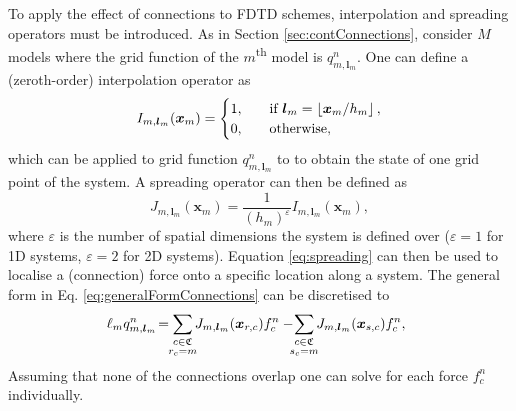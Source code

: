 \documentclass{article}
\begin{document}
To apply the effect of connections to FDTD schemes, interpolation and spreading operators must be introduced. As in Section \ref{sec:contConnections}, consider $M$ models where the grid function of the $m$\textsuperscript{th} model is $q_{m, \boldsymbol{l}_m}^n$. One can define a (zeroth-order) interpolation operator as
\begin{equation}
    I_{m, \boldsymbol{l}_m}(\boldsymbol{x}_m) = \begin{cases}
    1,&\quad \text{if}\ \boldsymbol{l}_m= \floor[\boldsymbol{x}_m/h_m],\\
    0, &\quad\text{otherwise},
    \end{cases}
\end{equation}
which can be applied to grid function $q_{m, \boldsymbol{l}_m}^n$ to to obtain the state of one grid point of the system. A spreading operator can then be defined as
\begin{equation}\label{eq:spreading}
    J_{m, \boldsymbol{l}_m}(\boldsymbol{x}_m) = \frac{1}{(h_m)^\varepsilon}I_{m, \boldsymbol{l}_m}(\boldsymbol{x}_m),
\end{equation}
where $\varepsilon$ is the number of spatial dimensions the system is defined over ($\varepsilon = 1$ for 1D systems, $\varepsilon = 2$ for 2D systems). Equation \eqref{eq:spreading} can then be used to localise a (connection) force onto a specific location along a system. 
The general form in Eq. \eqref{eq:generalFormConnections} can be discretised to
\begin{equation}\label{eq:generalFormConnectionsDisc}
    \!\!\!\ell_mq_{m, \boldsymbol{l}_m}^n \!=\!\!\sum_{\substack{c\in \mathfrak{C}\vspace{0.1em}\\ r_c = m}}\!\! J_{m, \boldsymbol{l}_m}(\boldsymbol{x}_{r, c}) f_c^n-\!\! \!\sum_{\substack{c\in \mathfrak{C}\vspace{0.1em}\\ s_c = m}}\!\! J_{m, \boldsymbol{l}_m}(\boldsymbol{x}_{s, c}) f_c^n,
\end{equation}
%
%
Assuming that none of the connections overlap %
one can solve for each force $f_c^n$ individually. 
\end{document}
